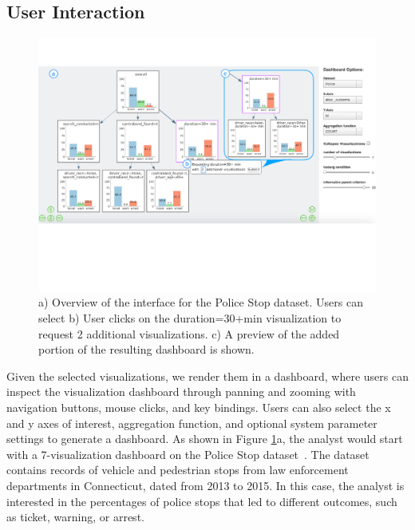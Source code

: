 \subsection{User Interaction\label{sec:interaction}}
\begin{figure}[ht!]
\centering
\includegraphics[width=0.95\linewidth,frame]{figures/overview_interface_expand.pdf}
\caption{a) Overview of the \system interface for the Police Stop dataset. Users can  select  b) User clicks on the duration=30+min visualization to request 2 additional visualizations. c) A preview of the added portion of the resulting dashboard is shown.}
\label{fig:overview}
\vspace{-10pt}
\end{figure}
\par Given the selected visualizations, we render them in a dashboard, where users can inspect the visualization dashboard through panning and zooming with navigation buttons, mouse clicks, and key bindings. Users can also select the x and y axes of interest, aggregation function, and optional system parameter settings to generate a dashboard. As shown in Figure \ref{fig:overview}a, the analyst would start with a 7-visualization dashboard on the Police Stop dataset~\cite{police}. The dataset contains records of vehicle and pedestrian stops from law enforcement departments in Connecticut, dated from 2013 to 2015. In this case, the analyst is interested in the percentages of police stops that led to different outcomes, such as ticket, warning, or arrest.
